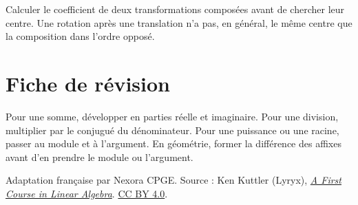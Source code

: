 \documentclass[11pt,a4paper]{article}
\begin{document}
Calculer le coefficient de deux transformations composées avant de chercher leur centre. Une rotation après une translation n’a pas, en général, le même centre que la composition dans l’ordre opposé.

\section*{Fiche de révision}
Pour une somme, développer en parties réelle et imaginaire. Pour une division, multiplier par le conjugué du dénominateur. Pour une puissance ou une racine, passer au module et à l’argument. En géométrie, former la différence des affixes avant d’en prendre le module ou l’argument.

\bigskip
{\footnotesize Adaptation française par Nexora CPGE. Source : Ken Kuttler (Lyryx),
\href{https://math.libretexts.org/Bookshelves/Linear_Algebra/A_First_Course_in_Linear_Algebra_(Kuttler)/06:_Complex_Numbers}{\textit{A First Course in Linear Algebra}}.
\href{https://creativecommons.org/licenses/by/4.0/}{CC BY 4.0}.}
\end{document}
